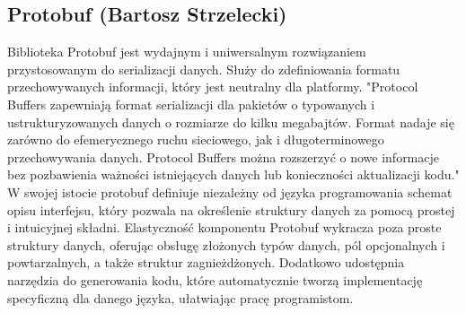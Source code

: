 \subsection{Protobuf (Bartosz Strzelecki)}\label{ss:protobuf}

Biblioteka Protobuf jest wydajnym i uniwersalnym rozwiązaniem przystosowanym do serializacji
danych. Służy do zdefiniowania formatu przechowywanych informacji, który jest neutralny dla platformy.
"Protocol Buffers zapewniają format serializacji dla pakietów o typowanych i ustrukturyzowanych danych o rozmiarze do kilku megabajtów. Format nadaje się zarówno do efemerycznego ruchu sieciowego, jak i długoterminowego przechowywania danych. Protocol Buffers można rozszerzyć o nowe informacje bez pozbawienia ważności istniejących danych lub konieczności aktualizacji kodu."\cite{protobuf}
W swojej istocie protobuf definiuje niezależny od języka programowania schemat opisu interfejsu,
który pozwala na określenie struktury danych za pomocą prostej i intuicyjnej składni.
Elastyczność komponentu Protobuf wykracza poza proste struktury danych, oferując obsługę złożonych typów danych, pól opcjonalnych i powtarzalnych,
a także struktur zagnieżdżonych. Dodatkowo udostępnia narzędzia do generowania kodu,
które automatycznie tworzą implementację specyficzną dla danego języka, ułatwiając pracę programistom.
